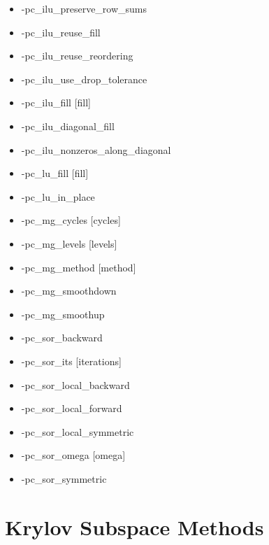 {\begin{itemize}
\item -pc\_ilu\_preserve\_row\_sums
\item -pc\_ilu\_reuse\_fill
\item -pc\_ilu\_reuse\_reordering
\item -pc\_ilu\_use\_drop\_tolerance
\item -pc\_ilu\_fill [fill]
\item -pc\_ilu\_diagonal\_fill
\item -pc\_ilu\_nonzeros\_along\_diagonal
\item -pc\_lu\_fill [fill]
\item -pc\_lu\_in\_place
\item -pc\_mg\_cycles [cycles]
\item -pc\_mg\_levels [levels]
\item -pc\_mg\_method [method]
\item -pc\_mg\_smoothdown
\item -pc\_mg\_smoothup
\item -pc\_sor\_backward
\item -pc\_sor\_its [iterations]
\item -pc\_sor\_local\_backward
\item -pc\_sor\_local\_forward
\item -pc\_sor\_local\_symmetric
\item -pc\_sor\_omega [omega]
\item -pc\_sor\_symmetric
\end{itemize}


{\footnotesize
\noindent

}

\section{Krylov Subspace Methods}

}
